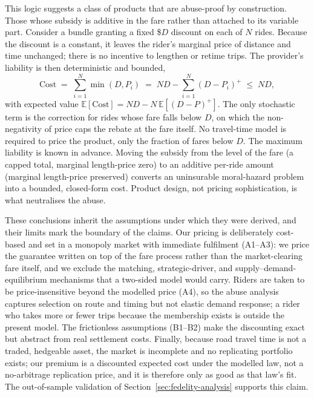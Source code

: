 \documentclass[12pt]{article}
\begin{document}
{{{{{{{{This logic suggests a class of products that are abuse-proof by construction. Those whose subsidy is additive in the fare rather than attached to its variable
part. Consider a bundle granting a fixed \$$D$ discount on each of $N$ rides.
Because the discount is a constant, it leaves the rider's marginal price of
distance and time unchanged; there is no incentive to lengthen or retime trips.
The provider's liability is then deterministic and bounded,
\begin{equation}
  \mathrm{Cost} \;=\; \sum_{i=1}^{N} \min(D, P_i)
  \;=\; ND - \sum_{i=1}^{N}(D - P_i)^{+} \;\le\; ND,
  \label{eq:additive-cost}
\end{equation}
with expected value $\mathbb{E}[\mathrm{Cost}] = ND - N\,\mathbb{E}[(D-P)^{+}]$.
The only stochastic term is the correction for rides whose fare falls below $D$,
on which the non-negativity of price caps the rebate at the fare itself. No travel-time model is required to price the product, only the fraction of fares
below $D$. The maximum liability is known in advance. Moving the subsidy
from the level of the fare (a capped total, marginal length-price zero) to an
additive per-ride amount (marginal length-price preserved) converts an
uninsurable moral-hazard problem into a bounded, closed-form cost. Product
design, not pricing sophistication, is what neutralises the abuse.
 
These conclusions inherit the assumptions under which they were derived, and
their limits mark the boundary of the claims. Our pricing is deliberately
cost-based and set in a monopoly market with immediate fulfilment (A1--A3): we
price the guarantee written on top of the fare process rather than the
market-clearing fare itself, and we exclude the matching, strategic-driver, and
supply--demand-equilibrium mechanisms that a two-sided model would carry. Riders
are taken to be price-insensitive beyond the modelled price (A4), so the abuse
analysis captures selection on route and timing but not elastic demand response;
a rider who takes more or fewer trips because the membership exists is outside
the present model. The frictionless assumptions (B1--B2) make the discounting exact but abstract from
real settlement costs. Finally, because road travel time is not a traded,
hedgeable asset, the market is incomplete and no replicating portfolio exists;
our premium is a discounted expected cost under the modelled law, not a
no-arbitrage replication price, and it is therefore only as good as that law's
fit. The out-of-sample validation of Section~\ref{sec:fedelity-analysis} supports this claim. 
 
}}}}}}}}
\end{document}
